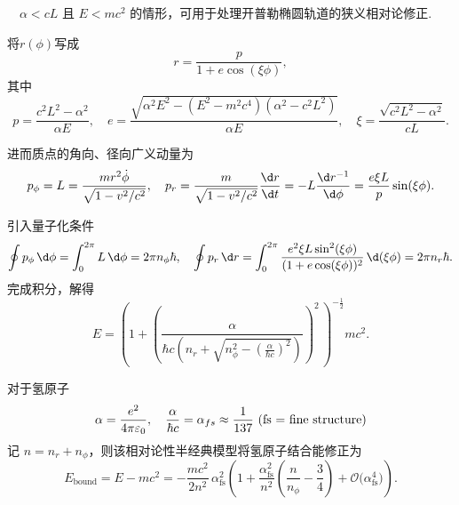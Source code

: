 \begin{example}
	\(\quad\alpha < cL\) 且 \(E < mc^2\) 的情形，可用于处理开普勒椭圆轨道的狭义相对论修正.

	将\(r(\phi)\)写成
	\begin{equation*}
		r = \dfrac{p}{1 + e \cos (\xi \phi)},
	\end{equation*}
	其中
	\begin{equation*}
		p = \dfrac{c^2 L^2 - \alpha^2}{\alpha E}, \quad
		e = \dfrac{\sqrt{\alpha^2 E^2 - (E^2 - m^2 c^4) (\alpha^2 - c^2 L^2)}}{\alpha E}, \quad
		\xi = \dfrac{\sqrt{c^2 L^2 - \alpha^2}}{cL}.
	\end{equation*}

	进而质点的角向、径向广义动量为
	\begin{equation*}
		p_{\phi} = L = \dfrac{m r^2 \dot{\phi}}{\sqrt{1 - v^2/c^2}}, \quad
		p_r = \dfrac{m}{\sqrt{1 - v^2/c^2}} \dfrac{\d r}{\d t} = -L \dfrac{\d r^{-1}}{\d \phi} = \dfrac{e\xi L}{p} \sin (\xi \phi).
	\end{equation*}

	引入量子化条件
	\begin{equation*}
		\oint p_{\phi} \, \d \phi =\int_{0}^{2\pi} L \, \d \phi = 2 \pi n_{\phi} \hbar, \quad
		\oint p_r \, \d r =\int_{0}^{2\pi} \dfrac{e^2 \xi L \sin^2 (\xi \phi)}{(1 + e \cos (\xi \phi))^2} \, \d(\xi \phi) = 2 \pi n_r \hbar.
	\end{equation*}
	完成积分，解得
	\begin{equation*}
		E = \left(1 + \left(\dfrac{\alpha}{\hbar c \left(n_r + \sqrt{n_{\phi}^2 - \left(\frac{\alpha}{\hbar c}\right)^2}\right)}\right)^2\,\right)^{-\frac{1}{2}} m c^2.
	\end{equation*}

	对于氢原子
	\begin{equation*}
		\alpha=\frac{e^2}{4\pi\varepsilon_0},\quad \frac{\alpha}{\hbar c}=\alpha_{fs}\approx\frac{1}{137}\,\text{\,(fs = fine structure)}
	\end{equation*}
	记 \(n=n_r+n_{\phi}\)，则该相对论性半经典模型将氢原子结合能修正为
	\begin{equation*}
		E_{\text{bound}} =
		E - mc^2 =
		-\frac{m c^2}{2 n^2}\,
		\alpha_{\mathrm{fs}}^2 \left(
		1 +
		\frac{
			\alpha_{\mathrm{fs}}^2
		}{n^2}\left(
		\frac{n}{n_{\phi}} - \frac{3}{4}
		\right)
		+ \mathcal{O}\bigl(\alpha_{\mathrm{fs}}^4\bigr)
		\right).
	\end{equation*}
\end{example}

